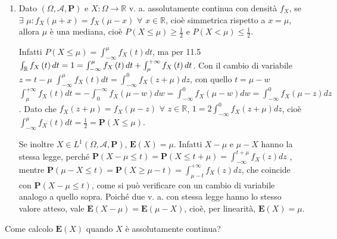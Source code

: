 \documentclass{article}
\begin{document}
\begin{enumerate}
\item Dato $\left( \Omega ,\mathcal{A},\mathbf{P}\right) $ e $X:\Omega
\rightarrow 
\mathbb{R}
$ v. a. assolutamente continua con densit\`{a} $f_{X}$, se $\exists $ $\mu
:f_{X}\left( \mu +x\right) =f_{X}\left( \mu -x\right) $ $\forall $ $x\in 
\mathbb{R}
$, cio\`{e} simmetrica rispetto a $x=\mu $, allora $\mu $ \`{e} una mediana,
cio\`{e} $P\left( X\leq \mu \right) \geq \frac{1}{2}$ e $P\left( X<\mu
\right) \leq \frac{1}{2}$.

Infatti $P\left( X\leq \mu \right) =\int_{-\infty }^{\mu }f_{X}\left(
t\right) dt$, ma per 11.5 $\int_{%
\mathbb{R}
}f_{X}\left( t\right) dt=1=\int_{-\infty }^{\mu }f_{X}\left( t\right)
dt+\int_{\mu }^{+\infty }f_{X}\left( t\right) dt$. Con il cambio di
variabile $z=t-\mu $ $\int_{-\infty }^{\mu }f_{X}\left( t\right)
dt=\int_{-\infty }^{0}f_{X}\left( z+\mu \right) dz$, con quello $t=\mu -w$ $%
\int_{\mu }^{+\infty }f_{X}\left( t\right) dt=-\int_{0}^{-\infty
}f_{X}\left( \mu -w\right) dw=\int_{-\infty }^{0}f_{X}\left( \mu -w\right)
dw=\int_{-\infty }^{0}f_{X}\left( \mu -z\right) dz$. Dato che $f_{X}\left(
z+\mu \right) =f_{X}\left( \mu -z\right) $ $\forall $ $z\in 
\mathbb{R}
$, $1=2\int_{-\infty }^{0}f_{X}\left( z+\mu \right) dz$, cio\`{e} $%
\int_{-\infty }^{\mu }f_{X}\left( t\right) dt=\frac{1}{2}=\mathbf{P}\left(
X\leq \mu \right) $.

Se inoltre $X\in L^{1}\left( \Omega ,\mathcal{A},\mathbf{P}\right) $, $%
\mathbf{E}\left( X\right) =\mu $. Infatti $X-\mu $ e $\mu -X$ hanno la
stessa legge, perch\'{e} $\mathbf{P}\left( X-\mu \leq t\right) =\mathbf{P}%
\left( X\leq t+\mu \right) =\int_{-\infty }^{t+\mu }f_{X}\left( z\right) dz$%
, mentre $\mathbf{P}\left( \mu -X\leq t\right) =\mathbf{P}\left( X\geq \mu
-t\right) =\int_{\mu -t}^{+\infty }f_{X}\left( z\right) dz$, che coincide
con $\mathbf{P}\left( X-\mu \leq t\right) $, come si pu\`{o} verificare con
un cambio di variabile analogo a quello sopra. Poich\'{e} due v. a. con
stessa legge hanno lo stesso valore atteso, vale $\mathbf{E}\left( X-\mu
\right) =\mathbf{E}\left( \mu -X\right) $, cio\`{e}, per linearit\`{a}, $%
\mathbf{E}\left( X\right) =\mu $.
\end{enumerate}

Come calcolo $\mathbf{E}\left( X\right) $ quando $X$ \`{e} assolutamente
continua?
\end{document}
